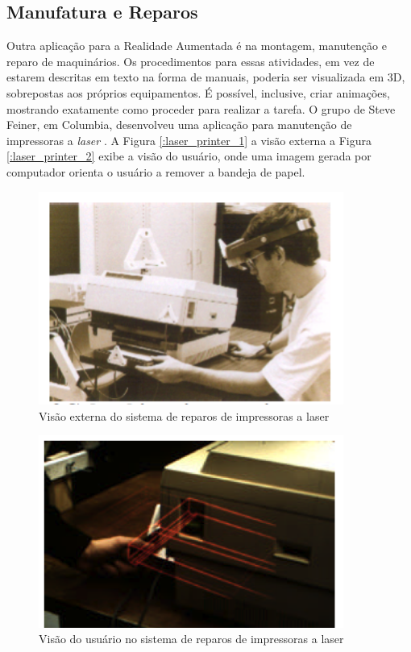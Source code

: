 \subsection{Manufatura e Reparos}

Outra aplicação para a Realidade Aumentada é na montagem, manutenção e reparo
de maquinários. Os procedimentos para essas atividades, em vez de estarem descritas
em texto na forma de manuais, poderia ser visualizada em 3D, sobrepostas aos
próprios equipamentos. É possível, inclusive, criar animações, mostrando exatamente
como proceder para realizar a tarefa. O grupo de Steve Feiner, em Columbia, desenvolveu
uma aplicação para manutenção de impressoras a \textit{laser} \cite{LaserPrinterAR}. 
A Figura \ref{:laser_printer_1} a visão externa a Figura \ref{:laser_printer_2} 
exibe a visão do usuário, onde uma 
imagem gerada por computador orienta o usuário a remover a bandeja de papel.


\begin{figure}[h!]
    \centering
    \caption{Visão externa do sistema de reparos de impressoras a laser}
    \label{fig:laser_printer_1}
    \includegraphics[width=10cm]{resources/laser-printer-1.png}
\end{figure}


\begin{figure}[h!]
    \centering
    \caption{Visão do usuário no sistema de reparos de impressoras a laser}
    \label{fig:laser_printer_2}
    \includegraphics[width=10cm]{resources/laser-printer-2.png}
\end{figure}



